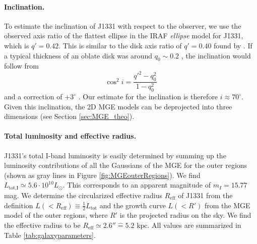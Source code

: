 \paragraph{Inclination.} To estimate the inclination of J1331 with respect to the observer, we use the observed axis ratio of the flattest ellipse in the IRAF \emph{ellipse} model for J1331, which is $q'=0.42$. This is similar to the disk axis ratio of $q' = 0.40$ found by \citet{SWELLSI}. If a typical thickness of an oblate disk was around $q_0 \sim 0.2$ \citep{1958MeLu2.136....1H}, the inclination would follow from 
\begin{equation*}
\cos^2 i = \frac{q'^2 - q_0^2}{1 - q_0^2}
\end{equation*}
and a correction of $+3^\circ$ \citep{1988ngc..book.....T}. Our estimate for the inclination is therefore $i \approx 70^\circ$. Given this inclination, the 2D MGE models can be deprojected into three dimensions (see Section \ref{sec:MGE_theo}).

\paragraph{Total luminosity and effective radius.} J1331's total I-band luminosity is easily determined by summing up the luminosity contributions of all the Gaussians of the MGE for the outer regions (shown as gray lines in Figure \ref{fig:MGEouterRegions}). We find $L_\text{tot,I} \simeq 5.6 \cdot 10^{10} L_\odot$. This corresponds to an apparent magnitude of $m_I = 15.77$ mag. We determine the circularized effective radius $R_\text{eff}$ of J1331 from the definition $L(<R_\text{eff}) \equiv \frac 12 L_\text{tot}$ and the growth curve $L(<R')$ from the MGE model of the outer regions, where $R'$ is the projected radius on the sky. We find the effective radius to be $R_\text{eff} \simeq 2.6'' \hat{=} 5.2 \text{ kpc}$.  All values are summarized in Table \ref{tab:galaxyparameters}.


